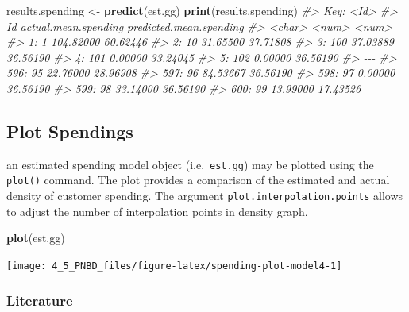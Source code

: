 \documentclass[
]{article}
\newenvironment{Shaded}{\begin{snugshade}}{\end{snugshade}}
\newcommand{\CommentTok}[1]{\textcolor[rgb]{0.56,0.35,0.01}{\textit{#1}}}
\newcommand{\FunctionTok}[1]{\textcolor[rgb]{0.13,0.29,0.53}{\textbf{#1}}}
\newcommand{\NormalTok}[1]{#1}
\newcommand{\OtherTok}[1]{\textcolor[rgb]{0.56,0.35,0.01}{#1}}
\begin{document}
\begin{Shaded}
\begin{Highlighting}[]
\NormalTok{results.spending }\OtherTok{\textless{}{-}} \FunctionTok{predict}\NormalTok{(est.gg)}
\FunctionTok{print}\NormalTok{(results.spending)}
\CommentTok{\#\textgreater{} Key: \textless{}Id\textgreater{}}
\CommentTok{\#\textgreater{}          Id actual.mean.spending predicted.mean.spending}
\CommentTok{\#\textgreater{}      \textless{}char\textgreater{}                \textless{}num\textgreater{}                   \textless{}num\textgreater{}}
\CommentTok{\#\textgreater{}   1:      1            104.82000                60.62446}
\CommentTok{\#\textgreater{}   2:     10             31.65500                37.71808}
\CommentTok{\#\textgreater{}   3:    100             37.03889                36.56190}
\CommentTok{\#\textgreater{}   4:    101              0.00000                33.24045}
\CommentTok{\#\textgreater{}   5:    102              0.00000                36.56190}
\CommentTok{\#\textgreater{}  {-}{-}{-}                                                    }
\CommentTok{\#\textgreater{} 596:     95             22.76000                28.96908}
\CommentTok{\#\textgreater{} 597:     96             84.53667                36.56190}
\CommentTok{\#\textgreater{} 598:     97              0.00000                36.56190}
\CommentTok{\#\textgreater{} 599:     98             33.14000                36.56190}
\CommentTok{\#\textgreater{} 600:     99             13.99000                17.43526}
\end{Highlighting}
\end{Shaded}

\subsection{Plot Spendings}\label{plot-spendings}

an estimated spending model object (i.e.~\texttt{est.gg}) may be plotted
using the \texttt{plot()} command. The plot provides a comparison of the
estimated and actual density of customer spending. The argument
\texttt{plot.interpolation.points} allows to adjust the number of
interpolation points in density graph.

\begin{Shaded}
\begin{Highlighting}[]
\FunctionTok{plot}\NormalTok{(est.gg)}
\end{Highlighting}
\end{Shaded}

\texttt{[image: 4\_5\_PNBD\_files/figure-latex/spending-plot-model4-1]}

\subsubsection{Literature}\label{literature}
\end{document}
